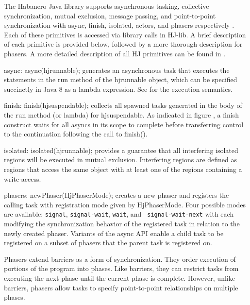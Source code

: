 The Habanero Java library supports asynchronous tasking, collective
synchronization, mutual exclusion, message passing, and point-to-point
synchronization with async, finish, isolated, actors, and phasers
respectively \cite{hj-lib}. Each of these primitives is accessed via library calls in
HJ-lib. A brief description of each primitive is provided below, followed by a more
thorough description for phasers. A more detailed description of all HJ
primitives can be found in \cite{Cave:2011:HNA:2093157.2093165,
shirako:2008:pud:1375527.1375568}. 
\begin{compactitem}
\item async: async(hjrunnable); generates an asynchronous task that executes the
statements in the run method of the hjrunnable object,
which can be specified succinctly in Java 8 as a lambda expression.
See  for the execution semantics.
\item finish: finish(hjsuspendable); collects all spawned tasks generated in the
body of the run method (or lambda) for hjsuspendable. As indicated in figure
, a finish construct waits for all asyncs in its scope
to complete before transferring control to the continuation following the call
to finish().
\item isolated: isolated(hjrunnable); provides a guarantee that all interfering
isolated regions will be executed in mutual exclusion. Interfering regions are
defined as regions that access the same object with at least one of the regions
containing a write-access.
\item phasers: newPhaser(HjPhaserMode); creates a new phaser and registers the
calling task with registration mode given by HjPhaserMode. Four possible modes
are available: {\tt signal}, {\tt signal-wait}, {\tt wait}, and {\tt
signal-wait-next} with each modifying the synchronization behavior of the
registered task in relation to the newly created phaser. Variants of the async
API enable a child task to be registered on a subset of phasers that the parent
task is registered on. 
\end{compactitem} 

Phasers extend barriers as a form of synchronization. They order execution of
portions of the program into phases. Like barriers, they can restrict tasks from
executing the next phase until the current phase is complete. However, unlike
barriers, phasers allow tasks to specify point-to-point relationships on
multiple phases.

